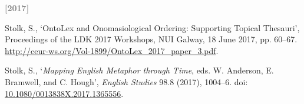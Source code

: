 \begin{list}{}
\begin{comment}
\item
`European Road OTL Framework', INTERLINK, Deliverable CEDR BIM Call 2015, eds. L. Wikstrom, M. Böhms, S. Stolk, 21 December 2018. \url{https://roadotl.eu/static/eurotl-ontologies/}. 
\lbl{Web vocabulary}
\end{comment}

\bigskip\item
\textcolor{gray}{\textbf{[2017]}}
%
\begin{comment}
\item
Stolk, S. and M. H. Porck, ‘Marking Boundaries in \textit{Beowulf}: Æschere’s Head, Grendel’s Arm and the Dragon’s Corpse’, \textit{Amsterdamer Beiträge zur älteren Germanistik} 77.3-4 (2017), 521–40. doi: \href{https://doi.org/10.1163/18756719-12340090}{\url{10.1163/18756719-12340090}}. 
\lbl{Article in journal}
\end{comment}
%
\item
Stolk, S., `OntoLex and Onomasiological Ordering: Supporting Topical Thesauri', Proceedings of the LDK 2017 Workshops, NUI Galway, 18 June 2017, pp. 60–67. \url{http://ceur-ws.org/Vol-1899/OntoLex_2017_paper_3.pdf}. 

\item
Stolk, S., `\textit{Mapping English Metaphor through Time}, eds. W. Anderson, E. Bramwell, and C. Hough', \textit{English Studies} 98.8 (2017), 1004–6. doi: \href{https://doi.org/10.1080/0013838X.2017.1365556}{\url{10.1080/0013838X.2017.1365556}}. 

\begin{comment}
\bigskip\item
\textcolor{gray}{\textbf{[2016]}}
%
\item
Stolk, S., D. Oostinga, N. Roest, ‘Data Clouds for Product Life-cycle Management’, Fifth International Symposium on Life-Cycle Civil Engineering, Delft University of Technology, 16-19 October 2016. doi: \href{https://doi.org/10.1201/9781315375175}{\url{10.1201/9781315375175}}. 
\lbl{Conference paper}
\end{comment}


\end{list}